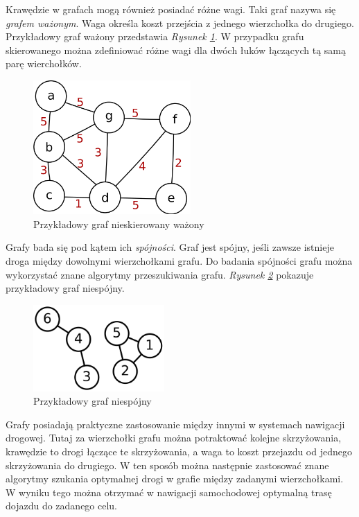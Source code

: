 \documentclass{article}
\begin{document}
\newpage
Krawędzie w grafach mogą również posiadać różne wagi. Taki graf nazywa się \emph{grafem ważonym}. Waga określa koszt przejścia z jednego wierzchołka do drugiego. Przykładowy graf ważony przedstawia \emph{Rysunek \ref{fig:weight_graph}}. W przypadku grafu skierowanego można zdefiniować różne wagi dla dwóch łuków łączących tą samą parę wierchołków.

\begin{figure}[htp]
    \centering
    \includegraphics[width=6cm]{images/graph_weights.png}
    \caption{Przykładowy graf nieskierowany ważony}
    \label{fig:weight_graph}
\end{figure}

Grafy bada się pod kątem ich \emph{spójności}. Graf jest spójny, jeśli zawsze istnieje droga między dowolnymi wierzchołkami grafu. Do badania spójności grafu można wykorzystać znane algorytmy przeszukiwania grafu. \emph{Rysunek \ref{fig:inconsistent_graph}} pokazuje przykładowy graf niespójny.

\begin{figure}[htp]
    \centering
    \includegraphics[width=5cm]{images/graph_inconsistent.png}
    \caption{Przykładowy graf niespójny}
    \label{fig:inconsistent_graph}
\end{figure}

Grafy posiadają praktyczne zastosowanie między innymi w systemach nawigacji drogowej. Tutaj za wierzchołki grafu można potraktować kolejne skrzyżowania, krawędzie to drogi łączące te skrzyżowania, a waga to koszt przejazdu od jednego skrzyżowania do drugiego. W ten sposób można następnie zastosować znane algorytmy szukania optymalnej drogi w grafie między zadanymi wierzchołkami. W wyniku tego można otrzymać w nawigacji samochodowej optymalną trasę dojazdu do zadanego celu.
\end{document}

